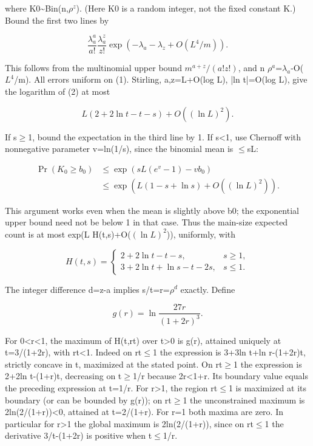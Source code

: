 \documentclass[11pt]{article}
\begin{document}
where K0\textasciitilde{}Bin(n,$\rho^{z}$). (Here K0 is a random integer, not the fixed constant K.) Bound the first two lines by

\[
\frac{\lambda_a^a}{a!}\frac{\lambda_a^z}{z!}
\exp(-\lambda_a-\lambda_z+O(L^4/m)).\tag{2}
\]

This follows from the multinomial upper bound $m^{a+z}/(a!z!)$, and n $\rho^{a}$=$\lambda_{a}$-O($L^{4}$/m). All errors uniform on (1). Stirling, a,z=L+O(log L), |ln t|=O(log L), give the logarithm of (2) at most

\[
L(2+2\ln t-t-s)+O((\ln L)^2).
\]

If s\ensuremath{\geq}1, bound the expectation in the third line by 1. If s<1, use Chernoff with nonnegative parameter v=ln(1/s), since the binomial mean is \ensuremath{\leq}sL:

\[
\begin{aligned}\Pr(K_0\geq b_0)&\leq\exp(sL(e^v-1)-vb_0)\\&\leq\exp(L(1-s+\ln s)+O((\ln L)^2)).\end{aligned}
\]

This argument works even when the mean is slightly above b0; the exponential upper bound need not be below 1 in that case. Thus the main-size expected count is at most exp(L H(t,s)+O($(\ln L)^2$)), uniformly, with

\[
H(t,s)=\begin{cases}2+2\ln t-t-s,&s\geq1,\\3+2\ln t+\ln s-t-2s,&s\leq1.\end{cases}
\]

The integer difference d=z-a implies s/t=r=$\rho^{d}$ exactly. Define

\[
g(r)=\ln\frac{27r}{(1+2r)^3}.
\]

For 0<r<1, the maximum of H(t,rt) over t>0 is g(r), attained uniquely at t=3/(1+2r), with rt<1. Indeed on rt\ensuremath{\leq}1 the expression is 3+3ln t+ln r-(1+2r)t, strictly concave in t, maximized at the stated point. On rt\ensuremath{\geq}1 the expression is 2+2ln t-(1+r)t, decreasing on t\ensuremath{\geq}1/r because 2r<1+r. Its boundary value equals the preceding expression at t=1/r. For r>1, the region rt\ensuremath{\leq}1 is maximized at its boundary (or can be bounded by g(r)); on rt\ensuremath{\geq}1 the unconstrained maximum is 2ln(2/(1+r))<0, attained at t=2/(1+r). For r=1 both maxima are zero. In particular for r>1 the global maximum is 2ln(2/(1+r)), since on rt\ensuremath{\leq}1 the derivative 3/t-(1+2r) is positive when t\ensuremath{\leq}1/r.
\end{document}
